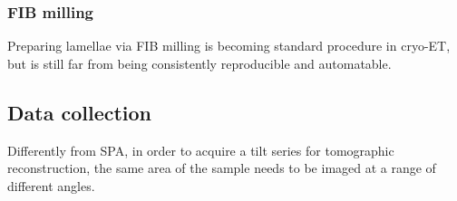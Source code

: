 \subsubsection{FIB milling}
Preparing lamellae via FIB milling is becoming standard procedure in cryo-ET, but is still far from being consistently reproducible and automatable.

\subsection{Data collection}\label{et_data_collection}
Differently from SPA, in order to acquire a tilt series for tomographic reconstruction, the same area of the sample needs to be imaged at a range of different angles.

\newpage

\FloatBarrier

